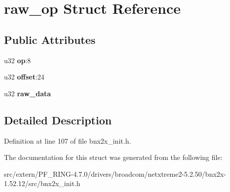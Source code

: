 \hypertarget{structraw__op}{
\section{raw\_\-op Struct Reference}
\label{structraw__op}
}
\subsection*{Public Attributes}
\begin{DoxyCompactItemize}
\item 
\hypertarget{structraw__op_ac0d90fae7be4633a42877c28a1b380f1}{
u32 {\bfseries op}:8}
\label{structraw__op_ac0d90fae7be4633a42877c28a1b380f1}

\item 
\hypertarget{structraw__op_a5e6896de73febcc5269f37cadb069605}{
u32 {\bfseries offset}:24}
\label{structraw__op_a5e6896de73febcc5269f37cadb069605}

\item 
\hypertarget{structraw__op_a0872a05873591d6825c2d5eacf1e0e5e}{
u32 {\bfseries raw\_\-data}}
\label{structraw__op_a0872a05873591d6825c2d5eacf1e0e5e}

\end{DoxyCompactItemize}


\subsection{Detailed Description}


Definition at line 107 of file bnx2x\_\-init.h.



The documentation for this struct was generated from the following file:\begin{DoxyCompactItemize}
\item 
src/extern/PF\_\-RING-\/4.7.0/drivers/broadcom/netxtreme2-\/5.2.50/bnx2x-\/1.52.12/src/bnx2x\_\-init.h\end{DoxyCompactItemize}
